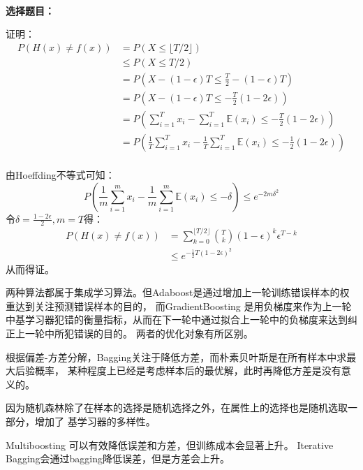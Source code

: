 \documentclass{ctexart}
\newcounter{answercnt}
\newcommand{\sCourse}{机器学习}   %
\newcommand{\nTime}{八}             %
\newcommand{\sName}{黄昊}           %
\newcommand{\sNumber}{20204205}     %
\begin{document}
    \setcounter{answercnt}{0}
    \begin{center}
        \\
        \fontsize{13pt}{0}{\textit{\kaishu\sName\qquad\sNumber}}
    \end{center}
\textbf{选择题目：}
    \answer[8.1]
    \answer[8.4]
    \answer[8.6]
    \answer[8.7]
    \answer[8.8]

    
\answer[8.1]
证明：
$$
\begin{aligned}
    P(H(x)\neq f(x))
&= P(X\leq \lfloor T/2 \rfloor)\\
&\leq P(X\leq  T/2)\\
&= P(X-(1-\epsilon)T\leq \frac{T}{2}-(1-\epsilon)T)\\
&= P(X-(1-\epsilon)T\leq -\frac{T}{2}(1-2\epsilon))\\
&= P(\sum_{i=1}^Tx_i-\sum_{i=1}^T\mathbb{E}(x_i)\leq-\frac{T}{2}(1-2\epsilon))\\
&= P(\frac{1}{T}\sum_{i=1}^Tx_i-\frac{1}{T}\sum_{i=1}^T\mathbb{E}(x_i)\leq-\frac{1}{2}(1-2\epsilon))\\
\end{aligned}
$$

由Hoeffding不等式可知：
$$
P(\frac{1}{m}\sum_{i=1}^mx_i-\frac{1}{m}\sum_{i=1}^m \mathbb{E}(x_i)\leq -\delta)\leq e^{-2m\delta^2}
$$
令$\delta = \frac{1-2\epsilon}{2},m=T$得：
$$
\begin{aligned}
    P(H(x)\neq f(x)) &= \sum_{k=0}^{\lfloor T/2 \rfloor}\binom{T}{k}(1-\epsilon)^k\epsilon^{T-k}\\
    &\leq e^{-\frac{1}{2}T(1-2\epsilon)^2}
\end{aligned}
$$
从而得证。

\answer[8.4]
两种算法都属于集成学习算法。但Adaboost是通过增加上一轮训练错误样本的权重达到关注预测错误样本的目的，
而GradientBoosting 是用负梯度来作为上一轮中基学习器犯错的衡量指标，从而在下一轮中通过拟合上一轮中的负梯度来达到纠正上一轮中所犯错误的目的。
两者的优化对象有所区别。

\answer[8.6]
根据偏差-方差分解，Bagging关注于降低方差，而朴素贝叶斯是在所有样本中求最大后验概率，
某种程度上已经是考虑样本后的最优解，此时再降低方差是没有意义的。

\answer[8.7]
因为随机森林除了在样本的选择是随机选择之外，在属性上的选择也是随机选取一部分，增加了
基学习器的多样性。

\answer[8.8]
Multiboosting 可以有效降低误差和方差，但训练成本会显著上升。
Iterative Bagging会通过bagging降低误差，但是方差会上升。
\end{document}
